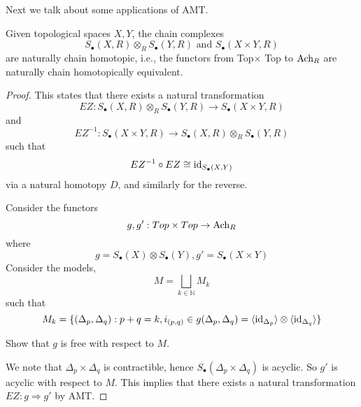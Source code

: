 Next we talk about some applications of AMT.
\begin{thm}
    Given topological spaces $X,Y$, the chain complexes 
    \begin{equation*}
        S_\bullet(X,R)\otimes_R S_\bullet(Y,R) \text{ and } S_\bullet(X\times Y,R)
    \end{equation*}
    are naturally chain homotopic, i.e., the functors from Top$\times$ Top to $\text{Ach}_R$ are naturally chain homotopically equivalent.
\end{thm}
\begin{proof}
    This states that there exists a natural transformation 
    \begin{equation*}
        EZ: S_\bullet(X,R)\otimes_R S_\bullet(Y,R)\to S_\bullet(X\times Y,R)
    \end{equation*}
    and 
    \begin{equation*}
        EZ^{-1}:S_\bullet(X\times Y,R)\to S_\bullet(X,R)\otimes_R S_\bullet(Y,R)
    \end{equation*}
    such that 
    \begin{equation*}
        EZ^{-1}\circ EZ\cong \text{id}_{S_\bullet(X,Y)}
    \end{equation*}
    via a natural homotopy $D$, and similarly for the reverse.

    Consider the functors 
    \begin{equation*}
        g,g':Top\times Top\to\text{Ach}_R
    \end{equation*}
    where 
    \begin{equation*}
        g=S_\bullet(X)\otimes S_\bullet(Y), g'=S_\bullet(X\times Y)
    \end{equation*}
    Consider the models,
    \begin{equation*}
        M=\bigsqcup_{k\in\mathbb{N}}M_k
    \end{equation*}
    such that 
    \begin{equation*}
        M_k=\{(\Delta_p,\Delta_q): p+q=k, i_{(p,q)}\in g(\Delta_p,\Delta_q)=\langle\text{id}_{\Delta_p}\rangle\otimes\langle\text{id}_{\Delta_q}\rangle\}
    \end{equation*}
    \begin{prob}[HW(3.1)]
        Show that $g$ is free with respect to $M$.
    \end{prob}
    We note that $\Delta_p\times\Delta_q$ is contractible, hence $S_\bullet(\Delta_p\times\Delta_q)$ is acyclic. So $g'$ is acyclic with respect to $M$. This implies that there exists a natural transformation $EZ:g\Rightarrow g'$ by AMT.
    

\end{proof}
